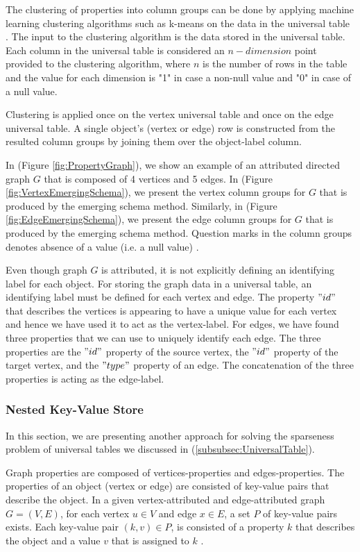 {The clustering of properties into column groups can be done by applying machine learning clustering algorithms such as k-means on the data in the universal table \cite{macqueen1967,Paradies2017}. The input to the clustering algorithm is the data stored in the universal table. Each column in the universal table is considered an $n-dimension$ point provided to the clustering algorithm, where $n$ is the number of rows in the table and the value for each dimension is "1" in case a non-null value and "0" in case of a null value. 

Clustering is applied once on the vertex universal table and once on the edge universal table. A single object's (vertex or edge) row is constructed from the resulted column groups by joining them over the object-label column.

In (Figure \ref{fig:PropertyGraph}), we show an example of an attributed directed graph $G$ that is composed of 4 vertices and 5 edges. In (Figure \ref{fig:VertexEmergingSchema}), we present the vertex column groups for $G$ that is produced by the emerging schema method. Similarly, in (Figure \ref{fig:EdgeEmergingSchema}), we present the edge column groups for $G$ that is produced by the emerging schema method. Question marks in the column groups denotes absence of a value (i.e. a null value) \cite{Paradies2017}. 

Even though graph $G$ is attributed, it is not explicitly defining an identifying label for each object. For storing the graph data in a universal table, an identifying label must be defined for each vertex and edge. The property $"id"$ that describes the vertices is appearing to have a unique value for each vertex and hence we have used it to act as the vertex-label. For edges, we have found three properties that we can use to uniquely identify each edge. The three properties are the $"id"$ property of the source vertex, the $"id"$ property of the target vertex, and the $"type"$ property of an edge. The concatenation of the three properties is acting as the edge-label.


\subsubsection{Nested Key-Value Store}
\label{subsubsec:NestedkeyValueStore}

In this section, we are presenting another approach for solving the sparseness problem of universal tables we discussed in (\ref{subsubsec:UniversalTable}).

Graph properties are composed of vertices-properties and edges-properties. The properties of an object (vertex or edge) are consisted of key-value pairs that describe the object. In a given vertex-attributed and edge-attributed graph $G = (V,E)$, for each vertex $u \in V$ and edge $x \in E$, a set $P$ of key-value pairs exists. Each key-value pair $(k,v) \in P$, is consisted of a property $k$ that describes the object and a value $v$ that is assigned to $k$ \cite{ladwig2011cumulusrdf}.

}

